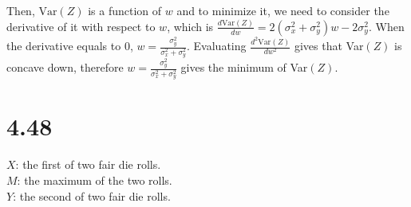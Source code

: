 \documentclass{article}
\begin{document}
\noindent
Then, $\text{Var}(Z)$ is a function of $w$ and to minimize it, we need to consider the derivative of it with respect to $w$, which is $\frac{d\text{Var}(Z)}{dw} = 2(\sigma^{2}_{x} + \sigma^{2}_{y})w - 2\sigma^{2}_{y}$. When the derivative equals to $0$, $w = \frac{\sigma^{2}_{y}}{\sigma^{2}_{x} + \sigma^{2}_{y}}$. Evaluating  $\frac{d^2\text{Var}(Z)}{dw^2}$ gives that Var$(Z)$ is concave down, therefore $w = \frac{\sigma^{2}_{y}}{\sigma^{2}_{x} + \sigma^{2}_{y}}$ gives the minimum of Var$(Z)$.

\section*{4.48}
$X$: the first of two fair die rolls.\\
$M$: the maximum of the two rolls.\\
$Y$: the second of two fair die rolls.
\end{document}
